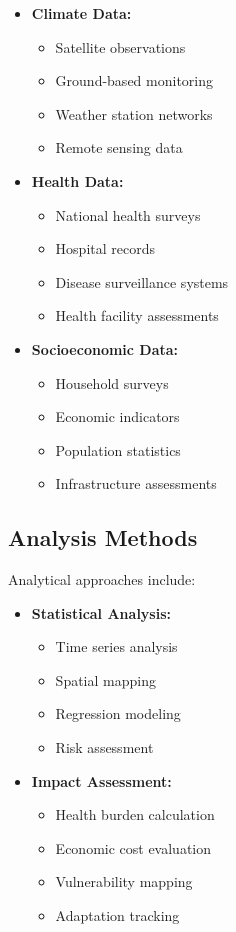 \begin{itemize}
    \item \textbf{Climate Data:}
    \begin{itemize}
        \item Satellite observations
        \item Ground-based monitoring
        \item Weather station networks
        \item Remote sensing data
    \end{itemize}
    
    \item \textbf{Health Data:}
    \begin{itemize}
        \item National health surveys
        \item Hospital records
        \item Disease surveillance systems
        \item Health facility assessments
    \end{itemize}
    
    \item \textbf{Socioeconomic Data:}
    \begin{itemize}
        \item Household surveys
        \item Economic indicators
        \item Population statistics
        \item Infrastructure assessments
    \end{itemize}
\end{itemize}

\subsection{Analysis Methods}
Analytical approaches include:

\begin{itemize}
    \item \textbf{Statistical Analysis:}
    \begin{itemize}
        \item Time series analysis
        \item Spatial mapping
        \item Regression modeling
        \item Risk assessment
    \end{itemize}
    
    \item \textbf{Impact Assessment:}
    \begin{itemize}
        \item Health burden calculation
        \item Economic cost evaluation
        \item Vulnerability mapping
        \item Adaptation tracking
    \end{itemize}
\end{itemize}

